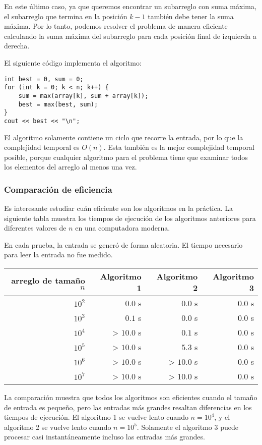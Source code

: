 En este último caso, ya que queremos
encontrar un subarreglo con suma máxima,
el subarreglo que termina en la posición $k-1$
también debe tener la suma máxima.
Por lo tanto, podemos resolver el problema de manera eficiente
calculando la suma máxima del subarreglo
para cada posición final de izquierda a derecha.

El siguiente código implementa el algoritmo:
\begin{lstlisting}
int best = 0, sum = 0;
for (int k = 0; k < n; k++) {
    sum = max(array[k], sum + array[k]);
    best = max(best, sum);
}
cout << best << "\n";
\end{lstlisting}

El algoritmo solamente contiene un ciclo
que recorre la entrada,
por lo que la complejidad temporal es $O(n)$.
Esta también es la mejor complejidad temporal posible,
porque cualquier algoritmo para el problema
tiene que examinar todos los elementos del arreglo al menos una vez.

\subsubsection{Comparación de eficiencia}

Es interesante estudiar cuán eficiente
son los algoritmos en la práctica.
La siguiente tabla muestra los tiempos de ejecución
de los algoritmos anteriores para diferentes
valores de $n$ en una computadora moderna.

En cada prueba, la entrada se generó de forma aleatoria.
El tiempo necesario para leer la entrada no fue
medido.

\begin{center}
\begin{tabular}{rrrr}
arreglo de tamaño $n$ & Algoritmo 1 & Algoritmo 2 & Algoritmo 3 \\
\hline
$10^2$ & $0.0$ s & $0.0$ s & $0.0$ s \\
$10^3$ & $0.1$ s & $0.0$ s & $0.0$ s \\
$10^4$ & > $10.0$ s & $0.1$ s & $0.0$ s \\
$10^5$ & > $10.0$ s & $5.3$ s & $0.0$ s \\
$10^6$ & > $10.0$ s & > $10.0$ s & $0.0$ s \\
$10^7$ & > $10.0$ s & > $10.0$ s & $0.0$ s \\
\end{tabular}
\end{center}

La comparación muestra que todos los algoritmos
son eficientes cuando el tamaño de entrada es pequeño,
pero las entradas más grandes resaltan
diferencias en los tiempos de ejecución.
El algoritmo 1 se vuelve lento
cuando $n=10^4$, y el algoritmo 2
se vuelve lento cuando $n=10^5$.
Solamente el algoritmo 3 puede procesar casi instantáneamente
incluso las entradas más grandes.